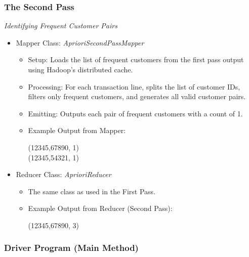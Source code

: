 \subsubsection{The Second Pass} \textit{Identifying Frequent Customer Pairs}

\begin{itemize}
    \item Mapper Class: \textit{AprioriSecondPassMapper}
    \begin{itemize}
        \item Setup: Loads the list of frequent customers from the first pass output using Hadoop’s distributed cache.
        \item Processing: For each transaction line, splits the list of customer IDs, filters only frequent customers, and generates all valid customer pairs.
        \item Emitting: Outputs each pair of frequent customers with a count of 1.
        \item Example Output from Mapper:
        \begin{center}
        (12345,67890, 1)\\
        (12345,54321, 1)
        \end{center}
    \end{itemize}

    \item Reducer Class: \textit{AprioriReducer}
    \begin{itemize}
        \item The same class as used in the First Pass.
        \item Example Output from Reducer (Second Pass):
        \begin{center}
        (12345,67890, 3)
        \end{center}
    \end{itemize}
\end{itemize}

\subsubsection{Driver Program (Main Method)}

